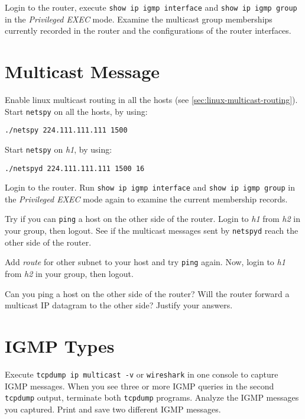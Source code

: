 \documentclass{../UTNetLab}
\begin{document}
    Login to the router, execute \lstinline{show ip igmp interface} and \lstinline{show ip igmp group} in the \textit{Privileged EXEC} mode.
    Examine the multicast group memberships currently recorded in the router and the configurations of the router interfaces.

\section{Multicast Message}
    Enable linux multicast routing in all the hosts (see \autoref{sec:linux-multicast-routing}).\\
    Start \lstinline{netspy} on all the hosts, by using:
    \begin{lstlisting}
./netspy 224.111.111.111 1500
    \end{lstlisting}
    Start \lstinline{netspy} on \textit{h1}, by using:
    \begin{lstlisting}
./netspyd 224.111.111.111 1500 16
    \end{lstlisting}
    
    Login to the router.
    Run \lstinline[language={cisco}]{show ip igmp interface} and \lstinline[language={cisco}]{show ip igmp group} in the \textit{Privileged EXEC} mode again to examine the current membership records.

    Try if you can \lstinline{ping} a host on the other side of the router.
    Login to \textit{h1} from \textit{h2} in your group, then logout.
    See if the multicast messages sent by \lstinline{netspyd} reach the other side of the router.

    Add \textit{route} for other subnet to your host and try \lstinline{ping} again. Now, login to \textit{h1} from \textit{h2} in your group, then logout.
    
    \begin{report}
    \item Can you ping a host on the other side of the router?
    Will the router forward a multicast IP datagram to the other side?
    Justify your answers.
    \end{report}

\section{IGMP Types}
    Execute \lstinline{tcpdump ip multicast -v} or \lstinline{wireshark} in one console to capture IGMP messages.
    When you see three or more IGMP queries in the second \lstinline{tcpdump} output, terminate both \lstinline{tcpdump} programs.
    Analyze the IGMP messages you captured.
    Print and save two different IGMP messages.
\end{document}
